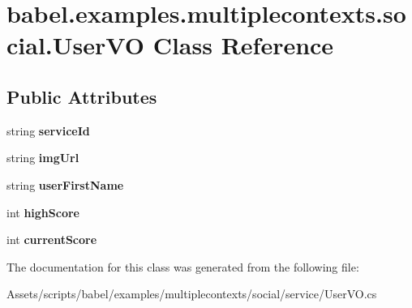 \hypertarget{classbabel_1_1examples_1_1multiplecontexts_1_1social_1_1_user_v_o}{\section{babel.\-examples.\-multiplecontexts.\-social.\-User\-V\-O Class Reference}
\label{classbabel_1_1examples_1_1multiplecontexts_1_1social_1_1_user_v_o}
}
\subsection*{Public Attributes}
\begin{DoxyCompactItemize}
\item 
\hypertarget{classbabel_1_1examples_1_1multiplecontexts_1_1social_1_1_user_v_o_a599f100a3ae4f1ff4a578b6732825064}{string {\bfseries service\-Id}}\label{classbabel_1_1examples_1_1multiplecontexts_1_1social_1_1_user_v_o_a599f100a3ae4f1ff4a578b6732825064}

\item 
\hypertarget{classbabel_1_1examples_1_1multiplecontexts_1_1social_1_1_user_v_o_aaec9b86f85ecedc5e6a7f2058de0b2c2}{string {\bfseries img\-Url}}\label{classbabel_1_1examples_1_1multiplecontexts_1_1social_1_1_user_v_o_aaec9b86f85ecedc5e6a7f2058de0b2c2}

\item 
\hypertarget{classbabel_1_1examples_1_1multiplecontexts_1_1social_1_1_user_v_o_a6ddd384b96f664e4625936aa24e41d3e}{string {\bfseries user\-First\-Name}}\label{classbabel_1_1examples_1_1multiplecontexts_1_1social_1_1_user_v_o_a6ddd384b96f664e4625936aa24e41d3e}

\item 
\hypertarget{classbabel_1_1examples_1_1multiplecontexts_1_1social_1_1_user_v_o_a6c2d885265e4d8b920da6e72065a0b02}{int {\bfseries high\-Score}}\label{classbabel_1_1examples_1_1multiplecontexts_1_1social_1_1_user_v_o_a6c2d885265e4d8b920da6e72065a0b02}

\item 
\hypertarget{classbabel_1_1examples_1_1multiplecontexts_1_1social_1_1_user_v_o_a2a5bc783c6c8249513f4664cb89139cd}{int {\bfseries current\-Score}}\label{classbabel_1_1examples_1_1multiplecontexts_1_1social_1_1_user_v_o_a2a5bc783c6c8249513f4664cb89139cd}

\end{DoxyCompactItemize}


The documentation for this class was generated from the following file\-:\begin{DoxyCompactItemize}
\item 
Assets/scripts/babel/examples/multiplecontexts/social/service/User\-V\-O.\-cs\end{DoxyCompactItemize}
